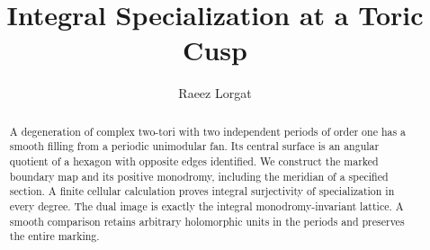 \documentclass[11pt]{article}
\title{Integral Specialization at a Toric Cusp}
\author{Raeez Lorgat}
\date{}
\numberwithin{equation}{section}
\begin{document}
\maketitle
\begin{abstract}
A degeneration of complex two-tori with two independent periods of
order one has a smooth filling from a periodic unimodular fan.
Its central surface is an angular quotient of a hexagon with opposite
edges identified. We construct the marked boundary map and its positive
monodromy, including the meridian of a specified section.
A finite cellular calculation proves integral surjectivity of
specialization in every degree. The dual image is exactly the integral
monodromy-invariant lattice. A smooth comparison retains arbitrary
holomorphic units in the periods and preserves the entire marking.
\end{abstract}

\end{document}
